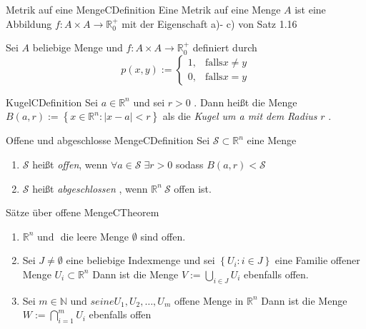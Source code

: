 \documentclass[a4paper]{memoir}
\begin{document}
\begin{ibox}{Metrik auf eine Menge}{CDefinition}
    Eine Metrik auf eine Menge $ A $ ist eine Abbildung $ f: A \times A 
    \to \mathbb{R}_{0}^{+}$ mit der Eigenschaft a)- c) von Satz 1.16 
\end{ibox}
Sei $ A $ beliebige Menge und  $ f: A \times A \to \mathbb{R}_{0}^{+}$
definiert durch $$ p(x,y) := \begin{cases}
    1, &\text{falls} x\neq y \\
    0, &\text{falls} x = y
\end{cases}
 $$
 \begin{ibox}{Kugel}{CDefinition}
     Sei $ a \in \mathbb{R}^{n} $ und sei $ r>0 $ . Dann heißt die Menge $ 
     B(a,r) := \left\{ x \in \mathbb{R}^{n} :\left| x-a \right|< r\right\} $ als die \textit{Kugel um a mit dem Radius } $ r $ .
 \end{ibox}
\begin{ibox}{Offene und abgeschlosse Menge}{CDefinition}
    Sei $ \mathcal{S} \subset \mathbb{R}^{n}$ eine Menge
    \begin{enumerate}[label=\alph*)]
        \item $ \mathcal{S}  $ heißt  \textit{offen}, wenn $ \forall a \in
            \mathcal{S}\; \exists r > 0 $ sodass $ B(a,r) < \mathcal{S}  $ 
        \item $ \mathcal{S} $ heißt \textit{abgeschlossen }, wenn $ 
            \mathbb{R}^n \ \mathcal{S}  $ offen ist. 
      \end{enumerate}
\end{ibox}
\begin{ibox}{Sätze über offene Menge}{CTheorem}
    \begin{enumerate}[label=\alph*)]
        \item $ \mathbb{R}^n \text{ und } $ die leere Menge $ \emptyset $ 
            sind offen.
        \item Sei $ J \neq \emptyset $ eine beliebige Indexmenge und sei 
            $ \left\{ U_{i} : i \in J \right\}  $ eine Familie offener Menge
            $ U_{i} \subset \mathbb{R}^n $  Dann ist die Menge $ V := 
            \bigcup\limits_{i \in J}^{} U_i $ ebenfalls offen. 
        \item Sei $ m \in \mathbb{N} \text{ und } seine U_1, U_2, \dots 
            , U_{m}$ offene Menge in $ \mathbb{R}^n $ Dann ist die Menge $ 
            W:= \bigcap\limits_{i =1}^{m} U_{i}  $ ebenfalls offen
    \end{enumerate}
\end{ibox}
\end{document}
